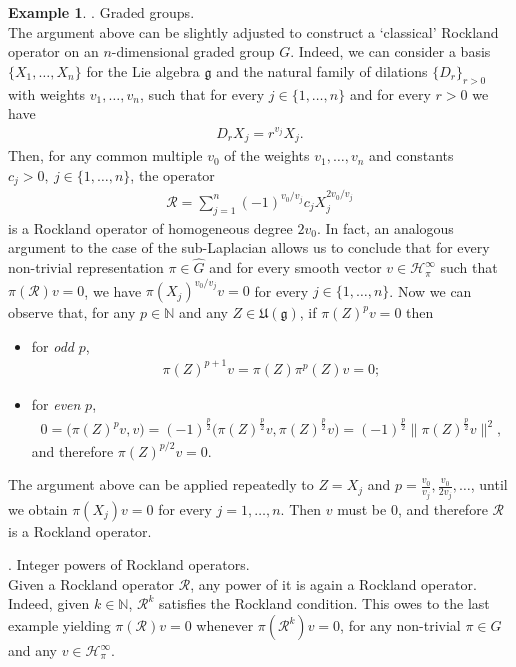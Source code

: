 \documentclass[12pt,oneside,a4paper]{book}
\numberwithin{equation}{section}     %
\theoremstyle{plain}
\theoremstyle{definition}
\newtheorem{example}[theorem]{Example}
\newcommand{\N}{{\mathbb N}}
\begin{document}
\begin{example}
	. Graded groups.\\
	\noindent The argument above can be slightly adjusted to construct a `classical' Rockland operator on an $n$-dimensional graded group $G$. Indeed, we can consider a basis $\{X_1,\ldots,X_n\}$ for the Lie algebra $\mathfrak{g}$ and the natural family of dilations $\{D_r\}_{r>0}$ with weights $v_1,\ldots,v_n$, such that for every $j\in\{1,\ldots,n\}$ and for every $r>0$ we have
	\begin{align*}
	D_r X_j=r^{v_j} X_j.
	\end{align*}
	Then, for any common multiple $v_0$ of the weights $v_1,\ldots,v_n$ and constants $c_j>0,~j\in\{1,\ldots,n\}$, the operator
	\begin{align*}
	\mathcal{R}=\sum_{j=1}^n (-1)^{v_0/v_j} c_j X_j^{2v_0/v_j}
	\end{align*}
	is a Rockland operator of homogeneous degree $2v_0$. In fact, an analogous argument to the case of the sub-Laplacian allows us to conclude that for every non-trivial representation $\pi\in\widehat{G}$ and for every smooth vector $v\in\mathcal{H}_\pi^{\infty}$ such that $\pi(\mathcal{R})v=0$, we have $\pi(X_j)^{v_0/v_j}v=0$ for every $j\in\{1,\dots,n\}$. Now we can observe that, for any $p\in\N$ and any $Z\in\mathfrak{U}(\mathfrak{g})$, if $\pi(Z)^pv=0$ then
	\begin{itemize}
		\item for \textit{odd} $p$,
		\begin{align*}
		\pi(Z)^{p+1}v=\pi(Z)\pi^p(Z)v=0;
		\end{align*}
		\item for \textit{even} $p$,
		\begin{align*}
		0=\big(\pi(Z)^pv,v\big)=(-1)^{\frac{p}{2}}\big(\pi(Z)^{\frac{p}{2}}v,\pi(Z)^{\frac{p}{2}}v\big)=(-1)^{\frac{p}{2}}\|\pi(Z)^{\frac{p}{2}}v\|^2,
		\end{align*}
		and therefore $\pi(Z)^{p/2}v=0$.
	\end{itemize}
	The argument above can be applied repeatedly to $Z=X_j$ and $p=\frac{v_0}{v_j},\frac{v_0}{2v_j},\dots$, until we obtain $\pi(X_j)v=0$ for every $j=1,\dots,n$. Then $v$ must be $0$, and therefore $\mathcal{R}$ is a Rockland operator.  
	
	. Integer powers of Rockland operators.\\
	\noindent Given a Rockland operator $\mathcal R$, any power of it is again a Rockland operator. Indeed, given $k\in\N$, $\mathcal R^k$ satisfies the Rockland condition. This owes to the last example yielding $\pi(\mathcal{R})v=0$ whenever $\pi(\mathcal{R}^k)v=0$, for any non-trivial $\pi\in\widehat{G}$ and any $v\in\mathcal{H}_\pi^{\infty}$.
\end{example}
\end{document}
